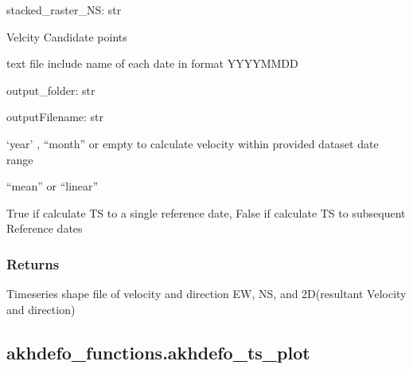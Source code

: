 \documentclass[letterpaper,10pt]{sphinxmanual}
\begin{document}
\begin{fulllineitems}
\sphinxAtStartPar
stacked\_raster\_NS: str
\begin{description}
\sphinxAtStartPar
Velcity Candidate points

\sphinxAtStartPar
text file include name of each date in format YYYYMMDD

\end{description}

\sphinxAtStartPar
output\_folder: str

\sphinxAtStartPar
outputFilename: str
\begin{description}
\sphinxAtStartPar
‘year’ , “month” or empty  to calculate velocity within provided dataset date range

\sphinxAtStartPar
“mean” or “linear”

\sphinxAtStartPar
True if calculate TS to a single reference date, False if calculate TS to subsequent Reference dates

\end{description}


\subsubsection{Returns}
\label{\detokenize{generated/akhdefo_functions.Time_Series:returns}}
\sphinxAtStartPar
Time\sphinxhyphen{}series shape file of velocity and direction EW, NS, and 2D(resultant Velocity and direction)

\end{fulllineitems}


\sphinxstepscope


\subsection{akhdefo\_functions.akhdefo\_ts\_plot}
\label{\detokenize{generated/akhdefo_functions.akhdefo_ts_plot:akhdefo-functions-akhdefo-ts-plot}}\label{\detokenize{generated/akhdefo_functions.akhdefo_ts_plot::doc}}
\end{document}
